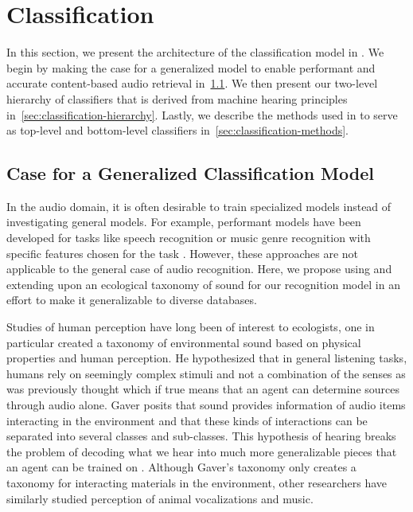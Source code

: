 \section{Classification}

In this section, we present the architecture of the classification model in
\sys. 
%
We begin by making the case for a generalized model to enable performant and
accurate content-based audio retrieval in~\cref{sec:classification-case}.
%
We then present our two-level hierarchy of classifiers that is derived from 
machine hearing principles in~\cref{sec:classification-hierarchy}.
%
Lastly, we describe the methods used in \sys to serve as top-level and
bottom-level classifiers in~\cref{sec:classification-methods}.

\subsection{Case for a Generalized Classification Model}
\label{sec:classification-case}

In the audio domain, it is often desirable to train specialized models instead
of investigating general models. For example, performant models have been
developed for tasks like speech recognition or music genre recognition with
specific features chosen for the task \cite{Campbell1997,
tzanetakis-musical-2002}. However, these approaches are not applicable to the
general case of audio recognition. Here, we propose using and extending upon an
ecological taxonomy of sound for our recognition model in an effort to make it
generalizable to diverse databases.

Studies of human perception have long been of interest to ecologists, one in
particular created a taxonomy of environmental sound based on physical
properties and human perception. He hypothesized that in general listening
tasks, humans rely on seemingly complex stimuli and not a combination of the
senses as was previously thought which if true means that an agent can determine
sources through audio alone. Gaver posits that sound provides information of
audio items interacting in the environment and that these kinds of interactions
can be separated into several classes and sub-classes. This hypothesis of
hearing breaks the problem of decoding what we hear into much more generalizable
pieces that an agent can be trained on \cite{Gaver1993}. Although Gaver's
taxonomy only creates a taxonomy for interacting materials in the environment,
other researchers have similarly studied perception of animal vocalizations and
music.

